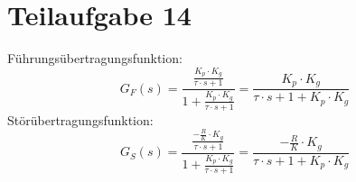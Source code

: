 \section{Teilaufgabe 14}
Führungsübertragungsfunktion: 
\[ G_F(s) 
    = \frac{\frac{K_p \cdot K_g}{\tau \cdot s + 1}}
        {1 + \frac{K_p \cdot K_g}{\tau \cdot s + 1}}
    = \frac{K_p \cdot K_g}{\tau \cdot s + 1 + K_p \cdot K_g}
\]
Störübertragungsfunktion:
\[ G_S(s)
    = \frac{\frac{-\frac{R}{K} \cdot K_g}{\tau \cdot s + 1}}
        {1 + \frac{K_p \cdot K_g}{\tau \cdot s + 1}}
    = \frac{-\frac{R}{K} \cdot K_g}{\tau \cdot s + 1 + K_p \cdot K_g}
\]
